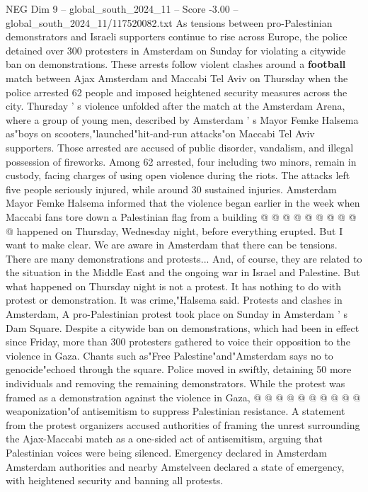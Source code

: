 \begin{textsample}{NEG Dim 9 – global\_south\_2024\_11 – Score -3.00 – global\_south\_2024\_11/117520082.txt}  \label{ex:f9_neg_420}
As tensions between pro-Palestinian demonstrators and Israeli supporters continue to rise across Europe, the police detained over 300 protesters in Amsterdam on Sunday for violating a citywide ban on demonstrations.
These arrests follow violent clashes around a \textbf{football} match between Ajax Amsterdam and Maccabi Tel Aviv on Thursday when the police arrested 62 people and imposed heightened security measures across the city.
Thursday ' s violence unfolded after the match at the Amsterdam Arena, where a group of young men, described by Amsterdam ' s Mayor Femke Halsema as"boys on scooters,"launched"hit-and-run attacks"on Maccabi Tel Aviv supporters.
Those arrested are accused of public disorder, vandalism, and illegal possession of fireworks.
Among 62 arrested, four including two minors, remain in custody, facing charges of using open violence during the riots.
The attacks left five people seriously injured, while around 30 sustained injuries.
Amsterdam Mayor Femke Halsema informed that the violence began earlier in the week when Maccabi fans tore down a Palestinian flag from a building @ @ @ @ @ @ @ @ @ @ happened on Thursday, Wednesday night, before everything erupted.
But I want to make clear.
We are aware in Amsterdam that there can be tensions.
There are many demonstrations and protests...
And, of course, they are related to the situation in the Middle East and the ongoing war in Israel and Palestine.
But what happened on Thursday night is not a protest.
It has nothing to do with protest or demonstration.
It was crime,"Halsema said.
Protests and clashes in Amsterdam, A pro-Palestinian protest took place on Sunday in Amsterdam ' s Dam Square.
Despite a citywide ban on demonstrations, which had been in effect since Friday, more than 300 protesters gathered to voice their opposition to the violence in Gaza.
Chants such as"Free Palestine"and"Amsterdam says no to genocide"echoed through the square.
Police moved in swiftly, detaining 50 more individuals and removing the remaining demonstrators.
While the protest was framed as a demonstration against the violence in Gaza, @ @ @ @ @ @ @ @ @ @ weaponization"of antisemitism to suppress Palestinian resistance.
A statement from the protest organizers accused authorities of framing the unrest surrounding the Ajax-Maccabi match as a one-sided act of antisemitism, arguing that Palestinian voices were being silenced.
Emergency declared in Amsterdam Amsterdam authorities and nearby Amstelveen declared a state of emergency, with heightened security and banning all protests.

\end{textsample}

